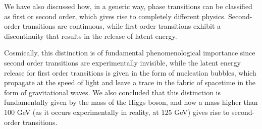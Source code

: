 \documentclass{article}
\numberwithin{equation}{section}
\begin{document}
We have also discussed how, in a generic way, phase transitions can be classified as first or second order, which gives rise to completely different physics. Second-order transitions are continuous, while first-order transitions exhibit a discontinuity that results in the release of latent energy. 

Cosmically, this distinction is of fundamental phenomenological importance since second order transitions are experimentally invisible, while the latent energy release for first order transitions is given in the form of nucleation bubbles, which propagate at the speed of light and leave a trace in the fabric of spacetime in the form of gravitational waves. We also concluded that this distinction is fundamentally given by the mass of the Higgs boson, and how a mass higher than $100$ GeV (as it occurs experimentally in reality, at $125$ GeV) gives rise to second-order transitions.
\end{document}

